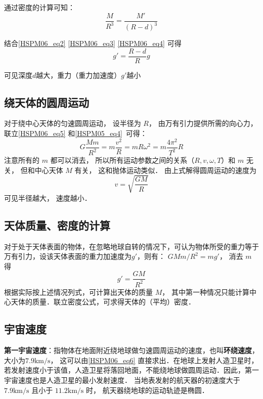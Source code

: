 通过密度的计算可知：
\begin{equation}\label{HSPM06_eq4}
\frac{M}{R^3}=\frac{M'}{(R-d)^3}
\end{equation}

结合\autoref{HSPM06_eq2} \autoref{HSPM06_eq3} \autoref{HSPM06_eq4} 可得
\begin{equation}
g'=\frac{R-d}{R}g
\end{equation}

可见深度$d$越大，重力（重力加速度）$g'$越小

\subsection{绕天体的圆周运动}

对于绕中心天体的匀速圆周运动， 设半径为 $R$， 由万有引力提供所需的向心力， 联立\autoref{HSPM06_eq5} 和\autoref{HSPM05_eq4}~可得：
\begin{equation}\label{HSPM06_eq8}
G\frac{Mm}{R^2}=m\frac{v^2}{R}=mR\omega^2=m\frac{4\pi^2}{T^2}R
\end{equation}
注意所有的 $m$ 都可以消去， 所以所有运动参数之间的关系（$R,v,\omega,T$）和 $m$ 无关， 但和中心天体 $M$ 有关， 这和抛体运动类似． 由上式解得圆周运动的速度为
\begin{equation}\label{HSPM06_eq6}
v = \sqrt{\frac{GM}{R}}
\end{equation}
可见半径越大， 速度越小．

\subsection{天体质量、密度的计算}

对于处于天体表面的物体，在忽略地球自转的情况下，可认为物体所受的重力等于万有引力，设该天体表面的重力加速度为$g'$，则有： $GMm/R^2=mg'$， 消去 $m$ 得
\begin{equation}
g' = \frac{GM}{R^2}
\end{equation}
根据实际按上述情况列式，可计算出天体的质量 $M$， 其中第一种情况只能计算中心天体的质量．联立密度公式，可求得天体的（平均）密度．

\subsection{宇宙速度}

\textbf{第一宇宙速度}：指物体在地面附近绕地球做匀速圆周运动的速度，也叫\textbf{环绕速度}，大小为$7.9\mathrm{km/s}$， 这可以由\autoref{HSPM06_eq6} 直接求出．在地球上发射人造卫星时，若发射速度小于该值，人造卫星将落回地面，不能绕地球做圆周运动．因此，第一宇宙速度也是人造卫星的最小发射速度． 当地表发射的航天器的初速度大于 $7.9\mathrm{km/s}$ 且小于 $11.2\mathrm{km/s}$ 时， 航天器绕地球的运动轨迹是椭圆．

